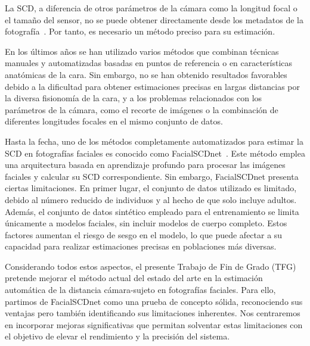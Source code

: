 La SCD, a diferencia de otros parámetros de la cámara como la longitud focal o el tamaño del sensor, no se puede obtener directamente desde los metadatos de la fotografía~\cite{8}. Por tanto, es necesario un método preciso para su estimación.


En los últimos años se han utilizado varios métodos que combinan técnicas manuales y automatizadas basadas en puntos de referencia o en características anatómicas de la cara\cite{28,30}. Sin embargo, no se han obtenido resultados favorables debido a la dificultad para obtener estimaciones precisas en largas distancias por la diversa fisionomía de la cara, y a los problemas relacionados con los parámetros de la cámara, como el recorte de imágenes o la combinación de diferentes longitudes focales en el mismo conjunto de datos.

Hasta la fecha, uno de los métodos completamente automatizados para estimar la SCD en fotografías faciales es conocido como FacialSCDnet~\cite{14}. Este método emplea una arquitectura basada en aprendizaje profundo para procesar las imágenes faciales y calcular su SCD correspondiente.
Sin embargo, FacialSCDnet presenta ciertas limitaciones. En primer lugar, el conjunto de datos utilizado es limitado, debido al número reducido de individuos y al hecho de que solo incluye adultos. Además, el conjunto de datos sintético empleado para el entrenamiento se limita únicamente a modelos faciales, sin incluir modelos de cuerpo completo. Estos factores aumentan el riesgo de sesgo en el modelo, lo que puede afectar a su capacidad para realizar estimaciones precisas en poblaciones más diversas.

Considerando todos estos aspectos, el presente Trabajo de Fin de Grado (TFG) pretende mejorar el método actual del estado del arte en la estimación automática de la distancia cámara-sujeto en fotografías faciales. Para ello, partimos de FacialSCDnet como una prueba de concepto sólida, reconociendo sus ventajas pero también identificando sus limitaciones inherentes. Nos centraremos en incorporar mejoras significativas que permitan solventar estas limitaciones con el objetivo de elevar el rendimiento y la precisión del sistema.

